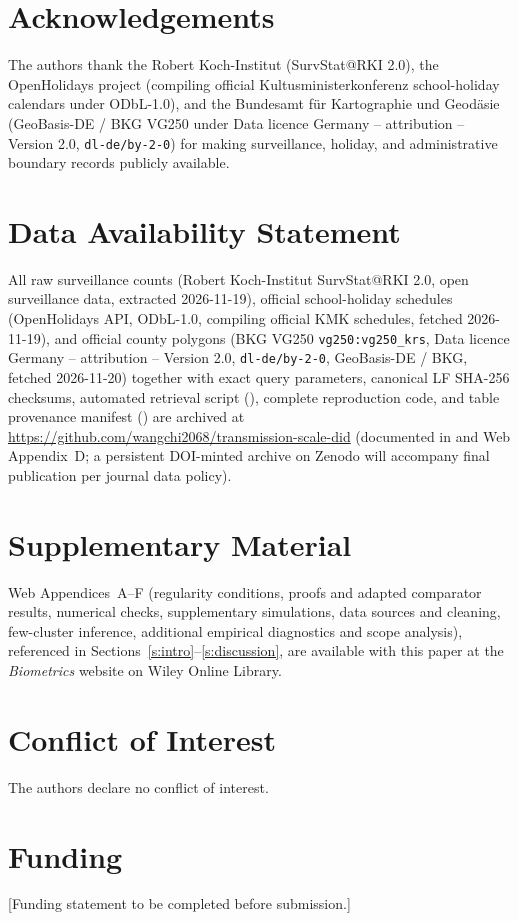 \section*{Acknowledgements}
The authors thank the Robert Koch-Institut (SurvStat@RKI 2.0), the OpenHolidays project (compiling
official Kultusministerkonferenz school-holiday calendars under ODbL-1.0), and the Bundesamt f\"ur
Kartographie und Geod\"asie (GeoBasis-DE / BKG VG250 under Data licence Germany -- attribution --
Version 2.0, \texttt{dl-de/by-2-0}) for making surveillance, holiday, and administrative boundary
records publicly available.

\section*{Data Availability Statement}
All raw surveillance counts (Robert Koch-Institut SurvStat@RKI 2.0, open surveillance data,
extracted 2026-11-19), official school-holiday schedules (OpenHolidays API, ODbL-1.0, compiling
official KMK schedules, fetched 2026-11-19), and official county polygons (BKG VG250
\texttt{vg250:vg250\_krs}, Data licence Germany -- attribution -- Version 2.0, \texttt{dl-de/by-2-0},
\textcopyright{} GeoBasis-DE / BKG, fetched 2026-11-20) together with exact query parameters,
canonical LF SHA-256 checksums, automated retrieval script (),
complete reproduction code, and table provenance manifest () are
archived at \url{https://github.com/wangchi2068/transmission-scale-did}
(documented in  and Web Appendix~D; a persistent
DOI-minted archive on Zenodo will accompany final publication per journal data policy).

\section*{Supplementary Material}
Web Appendices~A--F (regularity conditions, proofs and adapted comparator results, numerical checks,
supplementary simulations, data sources and cleaning, few-cluster inference, additional empirical
diagnostics and scope analysis), referenced in Sections~\ref{s:intro}--\ref{s:discussion},
are available with this paper at the \emph{Biometrics} website on Wiley Online Library.

\section*{Conflict of Interest}
The authors declare no conflict of interest.

\section*{Funding}
[Funding statement to be completed before submission.]
